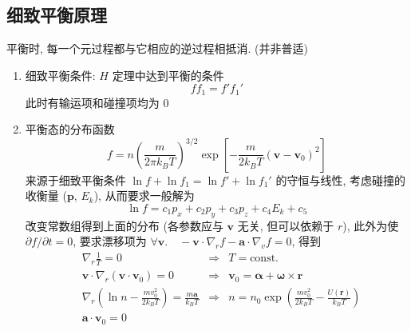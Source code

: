 \documentclass[12pt,a4paper]{article}%
\numberwithin{equation}{section}
\renewcommand*{\vec}[1]{\bm{#1}}%
\begin{document}
\subsection{细致平衡原理} %
\label{sub:detailed_balance}
平衡时, 每一个元过程都与它相应的逆过程相抵消. (并非普适)
\begin{enumerate}
    \item 细致平衡条件: $H$ 定理中达到平衡的条件
    \begin{equation}
        ff_1 = f'f_1'
    \end{equation}
    此时有输运项和碰撞项均为 $0$
    \item 平衡态的分布函数
    \begin{equation}
        f = n\left(\frac m{2\pi k_B T}\right)^{3/2}\exp\left[-\frac {m}{2k_B T}(\vec v-\vec v_0)^2\right]
    \end{equation}
    来源于细致平衡条件 $\ln f + \ln f_1 = \ln f' + \ln f_1'$ 的守恒与线性, 考虑碰撞的收衡量 ($\vec p$, $E_k$), 从而要求一般解为
    $$
     \ln f = c_1 p_x + c_2 p_y + c_3 p_z + c_4 E_k + c_5
    $$
    改变常数组得到上面的分布 (各参数应与 $\vec v$ 无关, 但可以依赖于 $r$), 此外为使 $\partial f/\partial t = 0$, 要求漂移项为 $\forall \vec v.\quad -\vec v\cdot\nabla_r f - \vec a\cdot\nabla_v f = 0$, 得到
    \begin{align}
        &\nabla_r \frac 1T = 0 
        &\Rightarrow& T = \mbox{const.}\\
        &\vec v\cdot\nabla_r(\vec v\cdot\vec v_0) = 0 
        &\Rightarrow& \vec v_0 = \vec \alpha + \vec\omega\times \vec r \\
        &\nabla_r\left(\ln n - \frac{mv_0^2}{2k_B T}\right) = \frac{m\vec a}{k_B T} 
        &\Rightarrow& n=n_0\exp\left(\frac{mv_0^2}{2k_BT} - \frac{U(\vec r)}{k_BT}\right) \\
        &\vec a \cdot\vec v_0 = 0
    \end{align}
\end{enumerate}
\appendix
\renewcommand\thesection{\Alph{section}}
\end{document}
